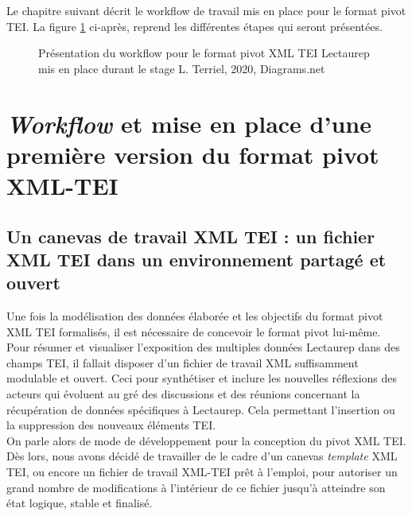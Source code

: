 \bigskip
Le chapitre suivant décrit le workflow de travail mis en place pour le format pivot TEI. La figure \ref{fig:workflow_tei_pivot_lectaurep} ci-après, reprend les différentes étapes qui seront présentées.
\begin{figure}
    \centering
    \centerline{}
    \caption{Présentation du workflow pour le format pivot XML TEI Lectaurep mis en place durant le stage  \textcopyright L. Terriel, 2020, Diagrams.net}
    \label{fig:workflow_tei_pivot_lectaurep}
\end{figure}
\clearpage
\thispagestyle{empty}

\chapter{\textit{Workflow} et mise en place d'une première version du format pivot XML-TEI}
\section{Un canevas de travail XML TEI : un fichier XML TEI dans un environnement partagé et ouvert}
Une fois la modélisation des données élaborée et les objectifs du format pivot XML TEI formalisés, il est nécessaire de concevoir le format pivot lui-même. 
Pour résumer et visualiser l'exposition des multiples données Lectaurep dans des champs TEI, il fallait disposer d'un fichier de travail XML suffisamment modulable et ouvert.
Ceci pour synthétiser et inclure les nouvelles réflexions des acteurs qui évoluent au gré des discussions et des réunions concernant la récupération de données spécifiques à Lectaurep. Cela permettant l'insertion ou la suppression des nouveaux éléments TEI.\\

On parle alors de mode de développement  pour la conception du pivot XML TEI. Dès lors, nous avons décidé de travailler de le cadre d'un canevas \textit{template} XML TEI, ou encore un fichier de travail XML-TEI prêt à l'emploi, pour autoriser un grand nombre de modifications à l'intérieur de ce fichier jusqu'à atteindre son état logique, stable et finalisé.\\

